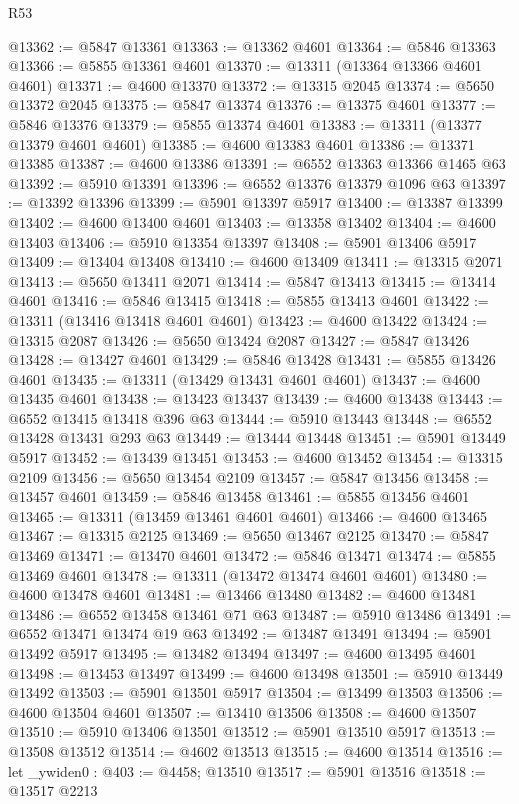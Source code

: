 \begin{lexlean}{R53}
\begin{coremodule}
@13362 := @5847 @13361
@13363 := @13362 @4601
@13364 := @5846 @13363
@13366 := @5855 @13361 @4601
@13370 := @13311 (@13364 @13366 @4601 @4601)
@13371 := @4600 @13370
@13372 := @13315 @2045
@13374 := @5650 @13372 @2045
@13375 := @5847 @13374
@13376 := @13375 @4601
@13377 := @5846 @13376
@13379 := @5855 @13374 @4601
@13383 := @13311 (@13377 @13379 @4601 @4601)
@13385 := @4600 @13383 @4601
@13386 := @13371 @13385
@13387 := @4600 @13386
@13391 := @6552 @13363 @13366 @1465 @63
@13392 := @5910 @13391
@13396 := @6552 @13376 @13379 @1096 @63
@13397 := @13392 @13396
@13399 := @5901 @13397 @5917
@13400 := @13387 @13399
@13402 := @4600 @13400 @4601
@13403 := @13358 @13402
@13404 := @4600 @13403
@13406 := @5910 @13354 @13397
@13408 := @5901 @13406 @5917
@13409 := @13404 @13408
@13410 := @4600 @13409
@13411 := @13315 @2071
@13413 := @5650 @13411 @2071
@13414 := @5847 @13413
@13415 := @13414 @4601
@13416 := @5846 @13415
@13418 := @5855 @13413 @4601
@13422 := @13311 (@13416 @13418 @4601 @4601)
@13423 := @4600 @13422
@13424 := @13315 @2087
@13426 := @5650 @13424 @2087
@13427 := @5847 @13426
@13428 := @13427 @4601
@13429 := @5846 @13428
@13431 := @5855 @13426 @4601
@13435 := @13311 (@13429 @13431 @4601 @4601)
@13437 := @4600 @13435 @4601
@13438 := @13423 @13437
@13439 := @4600 @13438
@13443 := @6552 @13415 @13418 @396 @63
@13444 := @5910 @13443
@13448 := @6552 @13428 @13431 @293 @63
@13449 := @13444 @13448
@13451 := @5901 @13449 @5917
@13452 := @13439 @13451
@13453 := @4600 @13452
@13454 := @13315 @2109
@13456 := @5650 @13454 @2109
@13457 := @5847 @13456
@13458 := @13457 @4601
@13459 := @5846 @13458
@13461 := @5855 @13456 @4601
@13465 := @13311 (@13459 @13461 @4601 @4601)
@13466 := @4600 @13465
@13467 := @13315 @2125
@13469 := @5650 @13467 @2125
@13470 := @5847 @13469
@13471 := @13470 @4601
@13472 := @5846 @13471
@13474 := @5855 @13469 @4601
@13478 := @13311 (@13472 @13474 @4601 @4601)
@13480 := @4600 @13478 @4601
@13481 := @13466 @13480
@13482 := @4600 @13481
@13486 := @6552 @13458 @13461 @71 @63
@13487 := @5910 @13486
@13491 := @6552 @13471 @13474 @19 @63
@13492 := @13487 @13491
@13494 := @5901 @13492 @5917
@13495 := @13482 @13494
@13497 := @4600 @13495 @4601
@13498 := @13453 @13497
@13499 := @4600 @13498
@13501 := @5910 @13449 @13492
@13503 := @5901 @13501 @5917
@13504 := @13499 @13503
@13506 := @4600 @13504 @4601
@13507 := @13410 @13506
@13508 := @4600 @13507
@13510 := @5910 @13406 @13501
@13512 := @5901 @13510 @5917
@13513 := @13508 @13512
@13514 := @4602 @13513
@13515 := @4600 @13514
@13516 := let _ywiden0 : @403 := @4458; @13510
@13517 := @5901 @13516
@13518 := @13517 @2213

\end{coremodule}
\end{lexlean}
